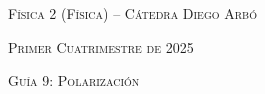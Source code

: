 \documentclass[11pt,spanish]{article}
\begin{document}
    \begin{center}
    \textsc{\large Física 2 (Física) -- Cátedra Diego Arbó}
    \par\end{center}{\large \par}
    
    \begin{center}
    \textsc{\large Primer Cuatrimestre de 2025}
    \par\end{center}{\large \par}
    
    \begin{center}
    \textsc{\large Guía 9: Polarización}
    \par\end{center}{\large \par}
\end{document}
